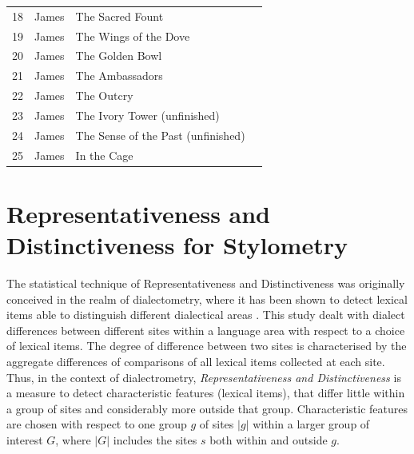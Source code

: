 \documentclass[a4paper,10pt,twoside,fleqn]{article}
\begin{document}
\begin{table}
\begin{minipage}{.62\linewidth}
\begin{tabular}{c l l l }
18		&James				&The Sacred Fount		&	\\ 
19		&James				&The Wings of the Dove		&	\\  
20		&James				&The Golden Bowl 		&	\\ %
21		&James				&The Ambassadors		&	\\ 
22		&James				&The Outcry			&	\\ %
23		&James				&The Ivory Tower (unfinished)	&	\\ %
24		&James				&The Sense of the Past (unfinished)&	\\%
25		&James				&In the Cage 			&	\\ %
\bottomrule
\end{tabular}

    \end{minipage} 
\end{table}








\section{Representativeness and Distinctiveness for Stylometry}
The statistical technique of Representativeness and Distinctiveness was 
originally conceived in the realm of dialectometry, where it has been
shown to detect lexical items able to distinguish different dialectical 
areas \cite{prokic2012detecting}.
This study dealt with dialect differences between different sites within 
a language area with respect to a choice of lexical items. 
The degree of difference between two sites is characterised by the aggregate 
differences of comparisons of all lexical items collected at 
each site. Thus, in the context of dialectrometry, 
\emph{Representativeness and Distinctiveness} is a measure to detect characteristic 
features (lexical items), that differ little within a group of sites 
and considerably more outside that group.
Characteristic features are chosen with respect to one group $g$ of sites 
$|g|$ within a larger group of interest $G$, where $|G|$ includes the sites 
$s$ both within and outside $g$.
\end{document}
